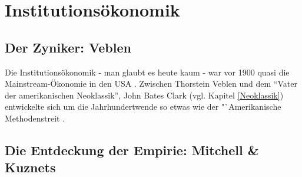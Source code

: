 %
%
%

\chapter{Institutionsökonomik}
\label{Institut}

\section{Der Zyniker: Veblen}
Die Institutionsökonomik - man glaubt es heute kaum - war vor 1900 quasi die Mainstream-Ökonomie in den USA \parencite[S. 97]{Persky2000}. Zwischen Thorstein Veblen und dem "`Vater der amerikanischen Neoklassik"', John Bates Clark (vgl. Kapitel \ref{Neoklassik}) entwickelte sich um die Jahrhundertwende so etwas wie der "`Amerikanische Methodenstreit \parencite[S. 100]{Persky2000}.

\section{Die Entdeckung der Empirie: Mitchell \& Kuznets}






